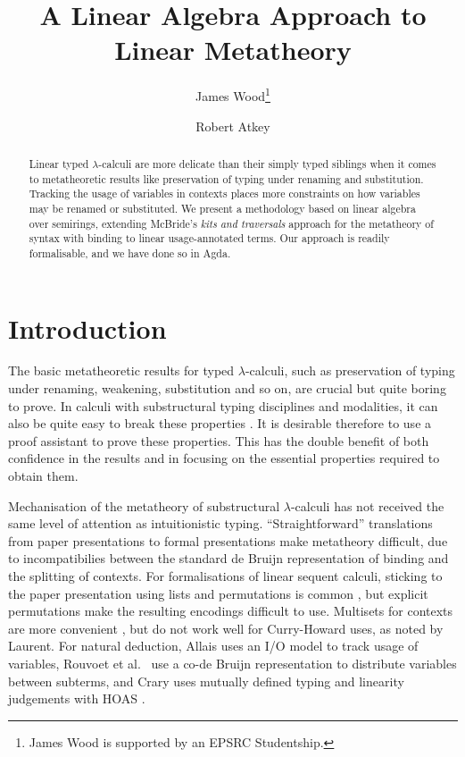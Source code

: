 \documentclass[submission,copyright,creativecommons]{eptcs}
\title{A Linear Algebra Approach to Linear Metatheory}
\author{
James Wood\thanks{James Wood is supported by an EPSRC Studentship.}
\institute{University of Strathclyde\\ Glasgow, United Kingdom}
\email{james.wood.100@strath.ac.uk}
\and
Robert Atkey
\institute{University of Strathclyde\\ Glasgow, United Kingdom}
\email{robert.atkey@strath.ac.uk}
}
\begin{document}
\maketitle

\begin{abstract}
  Linear typed $\lambda$-calculi are more delicate than their simply
  typed siblings when it comes to metatheoretic results like
  preservation of typing under renaming and substitution. Tracking the
  usage of variables in contexts places more constraints on how
  variables may be renamed or substituted. We present a methodology
  based on linear algebra over semirings, extending McBride's
  \emph{kits and traversals} approach for the metatheory of syntax with
  binding to linear usage-annotated terms. Our approach is readily
  formalisable, and we have done so in Agda.
\end{abstract}

\section{Introduction}

The basic metatheoretic results for typed $\lambda$-calculi, such as
preservation of typing under renaming, weakening, substitution and so
on, are crucial but quite boring to prove. In calculi with
substructural typing disciplines and modalities, it can also be quite
easy to break these properties \cite{wadler91use,BentonBPH93}. It is desirable
therefore to use a proof assistant to prove these properties. This has
the double benefit of both confidence in the results and in focusing
on the essential properties required to obtain them.

Mechanisation of the metatheory of substructural $\lambda$-calculi has
not received the same level of attention as intuitionistic
typing. ``Straightforward'' translations from paper presentations to
formal presentations make metatheory difficult, due to incompatibilies
between the standard de Bruijn representation of binding and the
splitting of contexts. For formalisations of linear sequent calculi,
sticking to the paper presentation using lists and permutations is
common \cite{power99,XavierORN18,laurent18}, but explicit permutations
make the resulting encodings difficult to use. Multisets for contexts
are more convenient \cite{ChaudhuriLR19}, but do not work well for
Curry-Howard uses, as noted by Laurent. For natural deduction, Allais
\cite{allais:LIPIcs:2018:10049} uses an I/O model to track usage of
variables, Rouvoet et al.~\cite{RPKV20} use a co-de Bruijn
representation to distribute variables between subterms, and Crary
uses mutually defined typing and linearity judgements with HOAS
\cite{crary10}.
\end{document}
